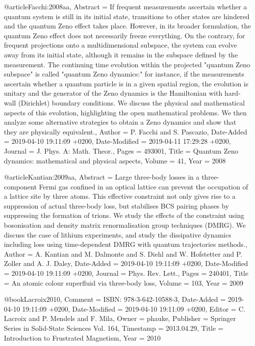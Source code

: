 \documentclass[epj,final]{svjour}
\begin{document}
{@article{Facchi:2008aa,
	Abstract = {If frequent measurements ascertain whether a quantum system is still in its initial state, transitions to other states are hindered and the quantum Zeno effect takes place. However, in its broader formulation, the quantum Zeno effect does not necessarily freeze everything. On the contrary, for frequent projections onto a multidimensional subspace, the system can evolve away from its initial state, although it remains in the subspace defined by the measurement. The continuing time evolution within the projected "quantum Zeno subspace" is called "quantum Zeno dynamics:" for instance, if the measurements ascertain whether a quantum particle is in a given spatial region, the evolution is unitary and the generator of the Zeno dynamics is the Hamiltonian with hard-wall (Dirichlet) boundary conditions. We discuss the physical and mathematical aspects of this evolution, highlighting the open mathematical problems. We then analyze some alternative strategies to obtain a Zeno dynamics and show that they are physically equivalent.},
	Author = {P. Facchi and S. Pascazio},
	Date-Added = {2019-04-10 19:11:09 +0200},
	Date-Modified = {2019-04-11 17:29:28 +0200},
	Journal = {J. Phys. A: Math. Theor.},
	Pages = {493001},
	Title = {Quantum Zeno dynamics: mathematical and physical aspects},
	Volume = {41},
	Year = {2008}}

@article{Kantian:2009aa,
	Abstract = {Large three-body losses in a three-component Fermi gas confined in an optical lattice can prevent the occupation of a lattice site by three atoms. This effective constraint not only gives rise to a suppression of actual three-body loss, but stabilises BCS pairing phases by suppressing the formation of trions. We study the effects of the constraint using bosonisation and density matrix renormalisation group techniques (DMRG). We discuss the case of lithium experiments, and study the dissipative dynamics including loss using time-dependent DMRG with quantum trajectories methods.},
	Author = {A. Kantian and M. Dalmonte and S. Diehl and W. Hofstetter and P. Zoller and A. J. Daley},
	Date-Added = {2019-04-10 19:11:09 +0200},
	Date-Modified = {2019-04-10 19:11:09 +0200},
	Journal = {Phys. Rev. Lett.},
	Pages = {240401},
	Title = {An atomic colour superfluid via three-body loss},
	Volume = {103},
	Year = {2009}}

@book{Lacroix2010,
	Comment = {ISBN: 978-3-642-10588-3},
	Date-Added = {2019-04-10 19:11:09 +0200},
	Date-Modified = {2019-04-10 19:11:09 +0200},
	Editor = {C. Lacroix and P. Mendels and F. Mila},
	Owner = {phauke},
	Publisher = {Springer Series in Solid-State Sciences Vol. 164},
	Timestamp = {2013.04.29},
	Title = {Introduction to Frustrated Magnetism},
	Year = {2010}}

}
\end{document}
